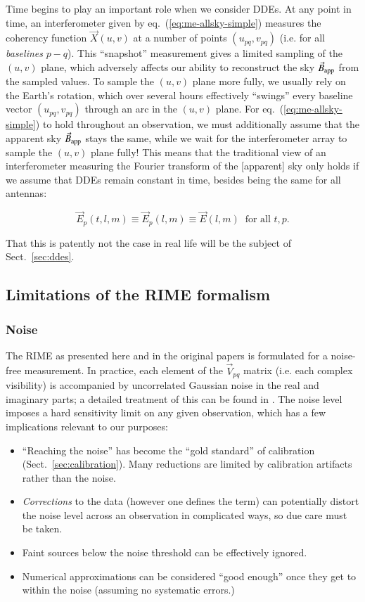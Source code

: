\documentclass[]{aa}
\begin{document}
Time begins to play an important role when we consider DDEs. At any point in time, an interferometer given by eq.~(\ref{eq:me-allsky-simple}) measures the coherency function $\vec X(u,v)$ at a number of points $(u_{pq},v_{pq})$ (i.e. for all {\em baselines} $p-q$). This ``snapshot'' measurement gives a limited sampling of the $(u,v)$ plane, which adversely affects our ability to reconstruct the sky $\vec B_{\rm app}$ from the sampled values. To sample the $(u,v)$ plane more fully, we usually rely on the Earth's rotation, which over several hours effectively ``swings'' every baseline vector $(u_{pq},v_{pq})$ through an arc in the $(u,v)$ plane. For eq.~(\ref{eq:me-allsky-simple}) to hold throughout an observation, we must additionally assume that the apparent sky $\vec B_{\rm app}$ stays the same, while we wait for the interferometer array to sample the $(u,v)$ plane fully! This means that the traditional view of an interferometer measuring the Fourier transform of the [apparent] sky only holds if we assume that DDEs remain constant in time, besides being the same for all antennas:

\[
\vec E_p(t,l,m) \equiv \vec E_p(l,m) \equiv \vec E(l,m)\;\;\mbox{for all~} t,p. 
\]

That this is patently not the case in real life will be the subject of Sect.~\ref{sec:ddes}.

\subsection{Limitations of the RIME formalism}

\subsubsection{\label{sec:noise}Noise}

The RIME as presented here and in the original papers is formulated for a noise-free measurement. In practice, each element of the $\vec V_{pq}$ matrix (i.e. each complex visibility) is accompanied by uncorrelated Gaussian noise in the real and imaginary parts; a detailed treatment of this can be found in \citet[Sect.~6.2]{tms}. The noise level imposes a hard sensitivity limit on any given observation, which has a few implications relevant to our purposes:

\begin{itemize}
\item ``Reaching the noise'' has become the ``gold standard'' of calibration (Sect.~\ref{sec:calibration}). 
Many reductions are limited by calibration artifacts rather than the noise.
\item {\em Corrections} to the data (however one defines the term) can potentially distort the noise level across an observation in complicated ways, so due care must be taken.
\item Faint sources below the noise threshold can be effectively ignored.
\item Numerical approximations can be considered ``good enough'' once they get to within the noise (assuming no systematic errors.)
\end{itemize}
\end{document}

